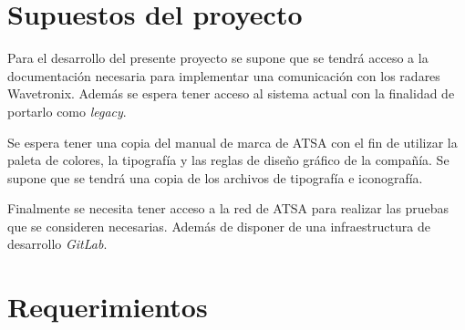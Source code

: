 \documentclass[
12pt,
spanish,
singlespacing,
parskip,
headsepline,]{article}
\begin{document}
\section{Supuestos del proyecto}

Para el desarrollo del presente proyecto se supone que se tendrá acceso a la documentación necesaria para implementar una comunicación con los radares Wavetronix.
Además se espera tener acceso al sistema actual con la finalidad de portarlo como \emph{legacy}.

Se espera tener una copia del manual de marca de ATSA con el fin de utilizar la paleta de colores, la tipografía y las reglas de diseño gráfico de la compañía. Se supone que se tendrá una copia de los archivos de tipografía e iconografía.

Finalmente se necesita tener acceso a la red de ATSA para realizar las pruebas que se consideren necesarias. Además de disponer de una infraestructura de desarrollo \emph{GitLab}.

\section{Requerimientos}
\end{document}
